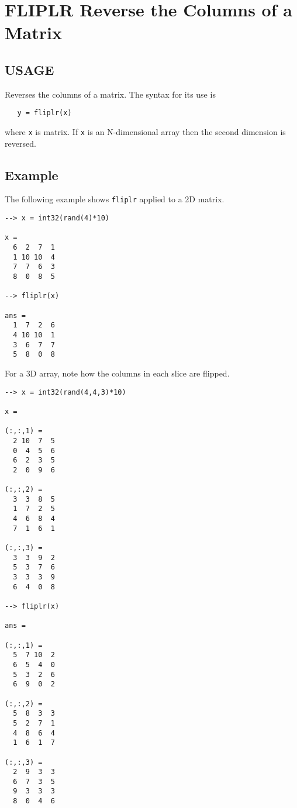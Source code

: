 \section{FLIPLR Reverse the Columns of a Matrix}

\subsection{USAGE}

Reverses the columns of a matrix.  The syntax for its use is
\begin{verbatim}
   y = fliplr(x)
\end{verbatim}
where \verb|x| is matrix.  If \verb|x| is an N-dimensional array then
the second dimension is reversed.
\subsection{Example}

The following example shows \verb|fliplr| applied to a 2D matrix.
\begin{verbatim}
--> x = int32(rand(4)*10)

x = 
  6  2  7  1 
  1 10 10  4 
  7  7  6  3 
  8  0  8  5 

--> fliplr(x)

ans = 
  1  7  2  6 
  4 10 10  1 
  3  6  7  7 
  5  8  0  8 
\end{verbatim}
For a 3D array, note how the columns in each slice are flipped.
\begin{verbatim}
--> x = int32(rand(4,4,3)*10)

x = 

(:,:,1) = 
  2 10  7  5 
  0  4  5  6 
  6  2  3  5 
  2  0  9  6 

(:,:,2) = 
  3  3  8  5 
  1  7  2  5 
  4  6  8  4 
  7  1  6  1 

(:,:,3) = 
  3  3  9  2 
  5  3  7  6 
  3  3  3  9 
  6  4  0  8 

--> fliplr(x)

ans = 

(:,:,1) = 
  5  7 10  2 
  6  5  4  0 
  5  3  2  6 
  6  9  0  2 

(:,:,2) = 
  5  8  3  3 
  5  2  7  1 
  4  8  6  4 
  1  6  1  7 

(:,:,3) = 
  2  9  3  3 
  6  7  3  5 
  9  3  3  3 
  8  0  4  6 
\end{verbatim}
